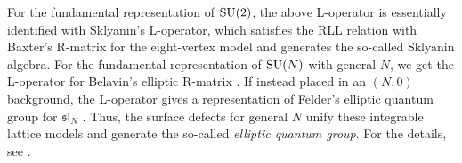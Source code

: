 For the fundamental representation of $\mathrm{SU}(2)$, the above L-operator
is essentially identified with Sklyanin's L-operator, which satisfies
the RLL relation with Baxter's R-matrix for the eight-vertex model
and generates the so-called Sklyanin algebra. For the fundamental
representation of $\mathrm{SU}(N)$ with general $N$, we get the L-operator
for Belavin's elliptic R-matrix \cite{Belavin:1981ix}. If instead placed in
an $( N,0 )$ background, the L-operator gives a representation
of Felder's elliptic quantum group for $\mathfrak{sl}_{N}$ \cite{Felder:1994pb,Felder:1994be,MR1606760}.
Thus, the surface defects for general $N$ unify these integrable lattice models and
generate the so-called \emph{elliptic quantum group}.
For the details, see \cite{Yagi:2017hmj}.










